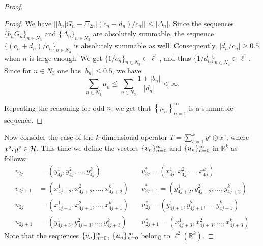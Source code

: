 \begin{proof}
\begin{proof}
        We have $\big\lvert |b_n| G_n - \Xi_{2n}\lvert (c_n + d_n)/c_n \rvert\big\rvert \leq \lvert \Delta_n \rvert$.
        Since the sequences $\{b_n G_n\}_{n\in N_3}$ and $\{\Delta_n\}_{n \in N_3}$ are absolutely summable, the sequence
          $\{(c_n + d_n) / c_n\}_{n\in N_3} $ is absolutely summable as well.
        Consequently, $\lvert d_n/c_n \rvert \geq 0.5$ when $n$ is large enough.
        We get $\{1/c_n\}_{n \in N_3} \in \ell^1$, and thus $\{1/d_n\}_{n \in N_3} \in \ell^1$.
        Since for $n \in N_3$ one has $\lvert b_n \rvert \leq 0.5$, we have
        \[
          \sum_{n\in N_3} \mu_n \leq \sum_{n \in N_3} \frac{1 + \lvert b_n\rvert}{\lvert d_n \rvert} < \infty.
        \]

        Repeating the reasoning for odd $n$, we get that $\left\{\mu_n\right\}_{n=1}^\infty$ is a summable sequence.
      \end{proof}
      \bigskip
      Now consider the case of the $k$-dimensional operator $T = \sum_{s=1}^k y^s \otimes x^s$, where $x^s, y^s \in \cal{H}$.
      This time we define the vectors $\seq{v}$ and $\seq{u}$ in $\mathbb{R}^k$ as follows:
      \begin{align*}
        v_{2j} &= (y^1_{4j}, y^2_{4j}, \dots ,y^k_{4j}) \quad
        &v^*_{2j} = (x^1_{4j}, x^2_{4j}, \dots ,x^k_{4j}) \\
        v_{2j+1} &= (x^1_{4j+2}, x^2_{4j+2}, \dots ,x^k_{4j+2}) \quad
        &v^*_{2j+1} = (y^1_{4j+2}, y^2_{4j+2}, \dots ,y^k_{4j+2}) \\
        u_{2j} &= (x^1_{4j+1}, x^2_{4j+1}, \dots ,x^k_{4j+1}) \quad
        &u^*_{2j} = (y^1_{4j+1}, y^2_{4j+1}, \dots ,y^k_{4j+1}) \\
        u_{2j+1} &= (y^1_{4j+3}, y^2_{4j+3}, \dots ,y^k_{4j+3}) \quad
        &u^*_{2j+1} = (x^1_{4j+3}, x^2_{4j+3}, \dots ,x^k_{4j+3})
      \end{align*}
      Note that the sequences $\seq{v}$, $\seq{u}$ belong to $\ell^2(\mathbb{R}^k)$.


\end{proof}

